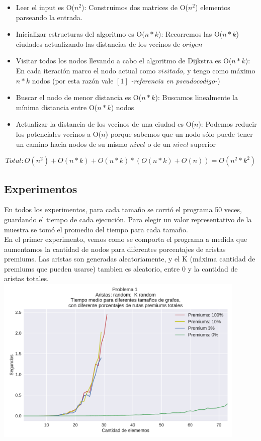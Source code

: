 \begin{itemize}
	\item Leer el input es O($n^2$): Construimos dos matrices de O($n^2$) elementos parseando la entrada.
	\item Inicializar estructuras del algoritmo es O($n*k$): Recorremos las O($n*k$) ciudades actualizando las distancias de los vecinos de $origen$
	\item Visitar todos los nodos llevando a cabo el algoritmo de Dijkstra es O($n*k$): En cada iteración marco el nodo actual como $visitado$, y tengo como máximo $n*k$ nodos (por esta razón vale  \label{whilejust}\hyperref[whileback]{$[1]$} \textit{-referencia en pseudocodigo-})
	\item Buscar el nodo de menor distancia es O($n*k$):  Buscamos linealmente la mínima distancia entre O($n*k$) nodos
	\item Actualizar la distancia de los vecinos de una ciudad es O($n$): Podemos reducir los potenciales vecinos a O($n$) porque sabemos que un nodo sólo puede tener un camino hacia nodos de su mismo $nivel$ o de un $nivel$ superior
\end{itemize}

$$Total:  O(n^2) + O(n*k) + O(n*k) * (O(n*k) + O(n)) = O(n^2*k^2) $$

\subsection{Experimentos}

En todos los experimentos, para cada tamaño se corrió el programa 50 veces, guardando el tiempo de cada ejecución. Para elegir un valor representativo de la muestra se tomó el promedio del tiempo para cada tamaño. \\

En el primer experimento, vemos como se comporta el programa a medida que aumentamos la cantidad de nodos para diferentes porcentajes de aristas premiums. Las aristas son generadas aleatoriamente, y el K (máxima cantidad de premiums que pueden usarse) tambien es aleatorio, entre 0 y la cantidad de aristas totales. \\

{\centering
  \includegraphics[width=0.9\textwidth]{imagenes/problema1/todo_random_bis.pdf} \\
}


